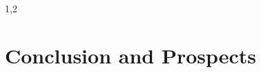 \documentclass[11pt,a4paper,twoside]{article}
\numberwithin{equation}{section}
\begin{document}
\begin{spacing}{1,2}
\section{Conclusion and Prospects}



\end{spacing}
\end{document}
